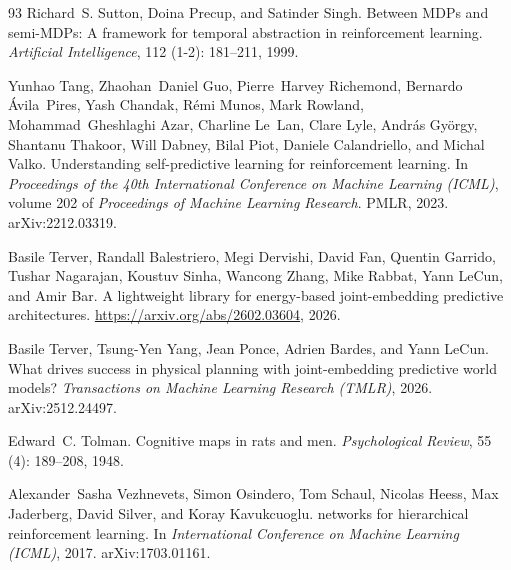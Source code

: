 \begin{thebibliography}{93}
Richard~S. Sutton, Doina Precup, and Satinder Singh.
\newblock Between {MDPs} and semi-{MDPs}: A framework for temporal abstraction
  in reinforcement learning.
\newblock \emph{Artificial Intelligence}, 112 (1-2):
  181--211, 1999.

Yunhao Tang, Zhaohan~Daniel Guo, Pierre~Harvey Richemond, Bernardo
  {\'A}vila~Pires, Yash Chandak, R{\'e}mi Munos, Mark Rowland,
  Mohammad~Gheshlaghi Azar, Charline Le~Lan, Clare Lyle, Andr{\'a}s Gy{\"o}rgy,
  Shantanu Thakoor, Will Dabney, Bilal Piot, Daniele Calandriello, and Michal
  Valko.
\newblock Understanding self-predictive learning for reinforcement learning.
\newblock In \emph{Proceedings of the 40th International Conference on Machine
  Learning (ICML)}, volume 202 of \emph{Proceedings of Machine Learning
  Research}. PMLR, 2023.
\newblock arXiv:2212.03319.

Basile Terver, Randall Balestriero, Megi Dervishi, David Fan, Quentin Garrido,
  Tushar Nagarajan, Koustuv Sinha, Wancong Zhang, Mike Rabbat, Yann LeCun, and
  Amir Bar.
\newblock A lightweight library for energy-based joint-embedding predictive
  architectures.
\newblock \url{https://arxiv.org/abs/2602.03604}, 2026{}.

Basile Terver, Tsung-Yen Yang, Jean Ponce, Adrien Bardes, and Yann LeCun.
\newblock What drives success in physical planning with joint-embedding
  predictive world models?
\newblock \emph{Transactions on Machine Learning Research (TMLR)},
  2026{}.
\newblock arXiv:2512.24497.

Edward~C. Tolman.
\newblock Cognitive maps in rats and men.
\newblock \emph{Psychological Review}, 55 (4): 189--208,
  1948.

Alexander~Sasha Vezhnevets, Simon Osindero, Tom Schaul, Nicolas Heess, Max
  Jaderberg, David Silver, and Koray Kavukcuoglu.
 networks for hierarchical reinforcement learning.
\newblock In \emph{International Conference on Machine Learning (ICML)}, 2017.
\newblock arXiv:1703.01161.


\end{thebibliography}
